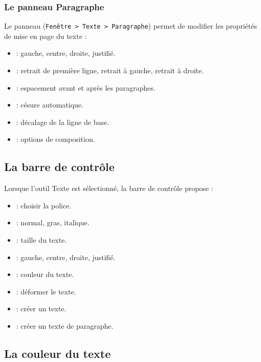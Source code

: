 \subsubsection{Le panneau Paragraphe}

Le panneau  (\texttt{Fenêtre > Texte > Paragraphe}) permet de modifier les propriétés de mise en page du texte :

\begin{itemize}
    \item {} : gauche, centre, droite, justifié.
    \item {} : retrait de première ligne, retrait à gauche, retrait à droite.
    \item {} : espacement avant et après les paragraphes.
    \item {} : césure automatique.
    \item {} : décalage de la ligne de base.
    \item {} : options de composition.
\end{itemize}

\subsection{La barre de contrôle}

Lorsque l'outil Texte est sélectionné, la barre de contrôle propose :

\begin{itemize}
    \item {} : choisir la police.
    \item {} : normal, gras, italique.
    \item {} : taille du texte.
    \item {} : gauche, centre, droite, justifié.
    \item {} : couleur du texte.
    \item {} : déformer le texte.
    \item {} : créer un texte.
    \item {} : créer un texte de paragraphe.
\end{itemize}

\subsection{La couleur du texte}

